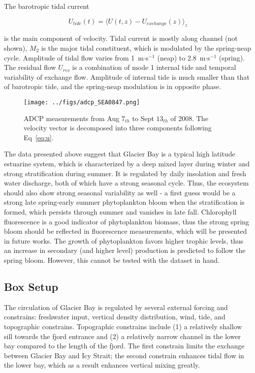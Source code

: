 \documentclass{article}
\begin{document}
The barotropic tidal current

\begin{equation}
U_{tide}(t) = \langle U(t, z)-U_{exchange}(z) \rangle_z
\label{eq:utide}
\end{equation}

is the main component of velocity. Tidal current is mostly along channel (not shown), $M_2$ is the major tidal constituent, which is modulated by the spring-neap cycle. Amplitude of tidal flow varies from 1~m$\cdot$s$^{-1}$ (neap) to 2.8~m$\cdot$s$^{-1}$ (spring).\\

The residual flow $U_{res}$ is a combination of mode 1 internal tide and temporal variability of exchange flow. Amplitude of internal tide is much smaller than that of barotropic tide, and the spring-neap modulation is in opposite phase.\\

\begin{figure}
\centerline{\texttt{[image: ../figs/adcp\_SEA0847.png]}}
\caption{ADCP measurements from Aug $7_{th}$ to Sept $13_{th}$ of 2008. The velocity vector is decomposed into three components following Eq~\ref{eq:u}.}
\label{fig:adcp}
\end{figure}

The data presented above suggest that Glacier Bay is a typical high latitude estuarine system, which is characterized by a deep mixed layer during winter and strong stratification during summer. It is regulated by daily insolation and fresh water discharge, both of which have a strong seasonal cycle. Thus, the ecosystem should also show strong seasonal variability as well - a first guess would be a strong late spring-early summer phytoplankton bloom when the stratification is formed, which persists through summer and vanishes in late fall. Chlorophyll fluorescence is a good indicator of phytoplankton biomass, thus the strong spring bloom should be reflected in fluorescence measurements, which will be presented in future works. The growth of phytoplankton favors higher trophic levels, thus an increase in secondary (and higher level) production is predicted to follow the spring bloom. However, this cannot be tested with the dataset in hand.\\

\subsection{Box Setup}
The circulation of Glacier Bay is regulated by several external forcing and constrains: freshwater input, vertical density distribution, wind, tide, and topographic constrains. Topographic constrains include (1) a relatively shallow sill towards the fjord entrance and (2) a relatively narrow channel in the lower bay compared to the length of the fjord. The first constrain limits the exchange between Glacier Bay and Icy Strait; the second constrain enhances tidal flow in the lower bay, which as a result enhances vertical mixing greatly.\\
\end{document}

